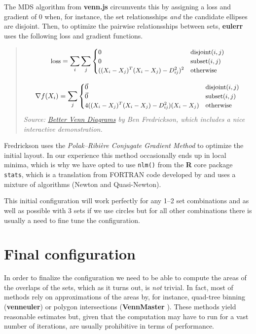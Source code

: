 \documentclass[
  headsepline=true,headings=standardclasses%
]{scrartcl}
\theoremstyle{definition}
\theoremstyle{definition}
\theoremstyle{definition}
\theoremstyle{remark}
\begin{document}
The MDS algorithm from \textbf{venn.js} circumvents this by assigning a
loss and gradient of 0 when, for instance, the set relationsships
\emph{and} the candidate ellipses are disjoint. Then, to optimize the
pairwise relationsships between sets, \textbf{eulerr} uses the following
loss and gradient functions.

\begin{quote}
\[\small
\text{loss} = \sum_i \sum_j { {\begin{cases}
    0 & \text{disjoint}(i, j)\\ 
    0 & \text{subset}(i, j)\\ 
    ((X_{i} - X_{j})^T(X_{i} - X_{j}) - D_{ij}^2) ^2  & \text{otherwise} \\ 
\end{cases}}}
\]

\[\small
\nabla f(X_{i}) = \sum_j {\begin{cases}
     \vec{0} & \text{disjoint}(i, j)\\ 
     \vec{0} & \text{subset}(i, j)\\ 
     4 {((X_{i} - X_{j})^T(X_{i} - X_{j}) - D_{ij}^2)} (X_{i} -
     X_{j}) & \text{otherwise} \\ 
\end{cases}}\] \emph{Source:
\href{http://www.benfrederickson.com/better-venn-diagrams/}{Better Venn
Diagrams} by Ben Fredrickson, which includes a nice interactive
demonstration.}
\end{quote}

Fredrickson uses the \emph{Polak--Ribière Conjugate Gradient Method} to
optimize the initial layout. In our experience this method occasionally
ends up in local minima, which is why we have opted to use
\texttt{nlm()} from the \textbf{R} core package \texttt{stats}, which is
a translation from FORTRAN code developed by \textcite{schnabel_1985}
and uses a mixture of algorithms (Newton and Quasi-Newton).

This initial configuration will work perfectly for any 1--2 set
combinations and as well as possible with 3 sets if we use circles but
for all other combinations there is usually a need to fine tune the
configuration.

\section{Final configuration}\label{final-configuration-1}

In order to finalize the configuration we need to be able to compute the
areas of the overlaps of the sets, which as it turns out, is \emph{not}
trivial. In fact, most of methods rely on approximations of the areas
by, for instance, quad-tree binning (\textbf{venneuler}) or polygon
intersections (\textbf{VennMaster} \autocite{kestler_2008}). These
methods yield reasonable estimates but, given that the computation may
have to run for a vast number of iterations, are usually prohibitive in
terms of performance.
\end{document}
